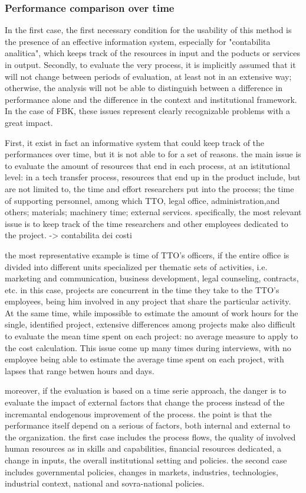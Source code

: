 \subsubsection{Performance comparison over time}

In the first case, the first necessary condition for the usability of this method is the presence of an effective information system, especially for "contabilita analitica", which keeps track of the resources in input and the poducts or services in output. Secondly, to evaluate the very process, it is implicitly assumed that it will not change between periods of evaluation, at least not in an extensive way; otherwise, the analysis will not be able to distinguish between a difference in performance alone and the difference in the context and institutional framework. In the case of FBK, these issues represent clearly recognizable problems with a great impact. 

First, it exist in fact an informative system that could keep track of the performances over time, but it is not able to for a set of reasons. the main issue is to evaluate the amount of resources that end in each process, at an istitutional level: in a tech transfer process, resources that end up in the product include, but are not limited to, the time and effort researchers put into the process; the time of supporting personnel, among which TTO, legal office, administration,and others; materials; machinery time; external services. specifically, the most relevant issue is to keep track of the time researchers and other employees dedicated to the project. -> contabilita dei costi

the most representative example is time of TTO's officers, if the entire office is divided into different units specialized per thematic sets of activities, i.e. marketing and communication, business development, legal counseling, contracts, etc. in this case, projects are concurrent in the time they take to the TTO's employees, being him involved in any project that share the particular activity. At the same time, while impossible to estimate the amount of work hours for the single, identified project, extensive differences among projects make also difficult to evaluate the mean time spent on each project: no average measure to apply to the cost calculation. This issue come up many times during interviews, with no employee being able to estimate the average time spent on each project, with lapses that range betwen hours and days.

moreover, if the evaluation is based on a time serie approach, the danger is to evaluate the impact of external factors that change the process instead of the incremantal endogenous improvement of the process. the point is that the performance itself depend on a serious of factors, both internal and external to the organization. the first case includes the process flows, the quality of involved human resources as in skills and capabilities, financial resources dedicated, a change in inputs, the overall institutional setting and policies. the second case includes governmental policies, changes in markets, industries, technologies, industrial context, national and sovra-national policies. 

